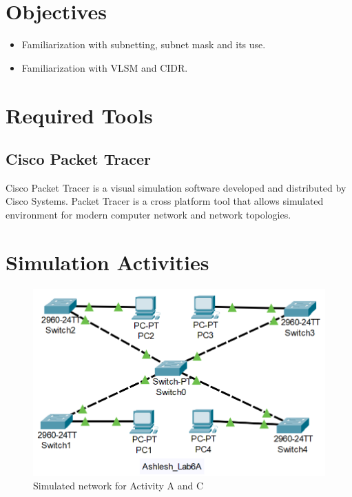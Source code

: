 \documentclass{lab_sheet}
\begin{document}
    \tableofcontents
    \pagebreak
    \listoffigures
    \pagebreak
    \listoftables
    \pagebreak
    \lstlistoflistings
    \pagebreak
    \section{Objectives}
    \begin{itemize}
        \item Familiarization with subnetting, subnet mask and its use.
        \item Familiarization with VLSM and CIDR.
    \end{itemize}
    \section{Required Tools}
    \subsection{Cisco Packet Tracer}
    Cisco Packet Tracer is a visual simulation software developed and distributed by Cisco Systems. Packet Tracer is a cross platform tool that allows simulated environment for modern computer network and network topologies.
    \section{Simulation Activities}
    \begin{figure}[H]
        \centering
        \includegraphics[scale=.5]{Figures/activitya.png}
        \caption{Simulated network for Activity A and C}
        \label{fig:activitya}
    \end{figure}
\end{document}
